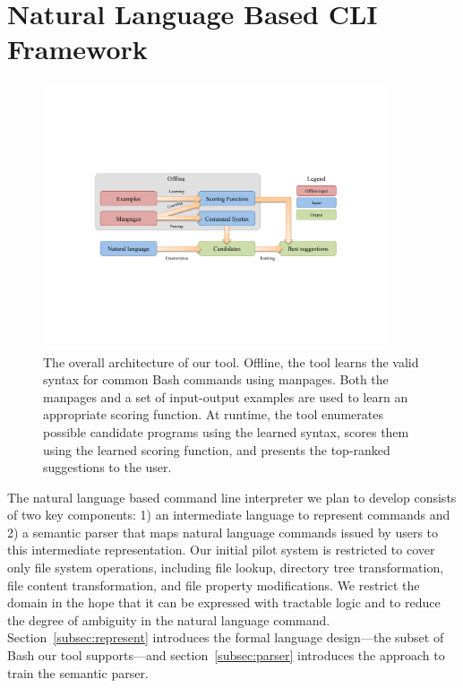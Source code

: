 \section{Natural Language Based CLI Framework}
\label{sec:framework}

\begin{figure}[h]
    \begin{center} \includegraphics[width=4in]{architecture.pdf} \end{center}
    \caption{The overall architecture of our tool. Offline, the tool learns the
        valid syntax for common Bash commands using manpages. Both the manpages
        and a set of input-output examples are used to learn an appropriate
        scoring function. At runtime, the tool enumerates possible candidate
        programs using the learned syntax, scores them using the learned scoring
        function, and presents the top-ranked suggestions to the user.}
    \label{fig:arch}
\end{figure}

The natural language based command line interpreter we plan to develop consists of two key components: 1) an intermediate language to represent commands and
2) a semantic parser that maps natural language commands issued by users to this intermediate representation. Our initial pilot system is restricted to cover only file system operations, including file lookup, directory tree transformation, file content transformation, and file property modifications. We restrict the domain in the hope that it can be expressed with tractable logic and to reduce the degree of ambiguity in the natural language command. Section~\ref{subsec:represent} introduces the formal language design---the subset of Bash our tool supports---and section~\ref{subsec:parser} introduces the approach to train the semantic parser.

